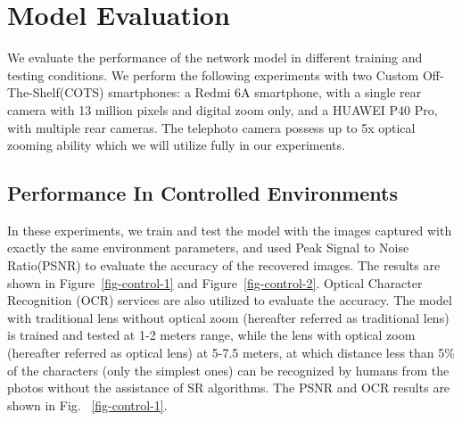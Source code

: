 \section{Model Evaluation}
\label{sec-evaluation}
We evaluate the performance of the network model in different training and testing conditions. We perform the following experiments with two Custom Off-The-Shelf(COTS) smartphones: a Redmi 6A smartphone, with a single rear camera with 13 million pixels and digital zoom only, and a HUAWEI P40 Pro, with multiple rear cameras. The telephoto camera possess up to 5x optical zooming ability which we will utilize fully in our experiments.
 
\subsection{Performance In Controlled Environments}

In these experiments, we train and test the model with the images captured with exactly the same environment parameters, and used Peak Signal to Noise Ratio(PSNR) to evaluate the accuracy of the recovered images. The results are shown in Figure~\ref{fig-control-1} and Figure~\ref{fig-control-2}. Optical Character Recognition (OCR) services are also utilized to evaluate the accuracy. The model with traditional lens without optical zoom (hereafter referred as traditional lens) is trained and tested at 1-2 meters range, while the lens with optical zoom (hereafter referred as optical lens) at 5-7.5 meters, at which distance less than 5\% of the characters (only the simplest ones) can be recognized by humans from the photos without the assistance of SR algorithms. The PSNR and OCR results are shown in Fig. ~\ref{fig-control-1}.


